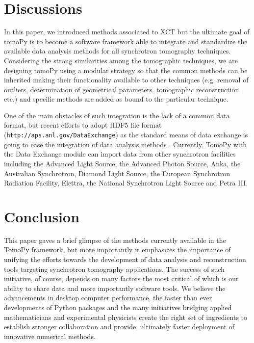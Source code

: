 \documentclass[pdf]{iucr}              %
\begin{document}


\section{Discussions}

In this paper, we introduced methods associated to XCT but the ultimate goal of tomoPy is to become a software framework able to integrate and standardize the available data analysis methods for all synchrotron tomography techniques. Considering the strong similarities among the tomographic techniques, we are designing tomoPy using a modular strategy so that the common methods can be inherited making their functionality available to other techniques (e.g. removal of outliers, determination of geometrical parameters, tomographic reconstruction, etc.) and specific methods are added as bound to the particular technique. 

One of the main obstacles of such integration is the lack of a common data format, but recent efforts to adopt HDF5 file format (\texttt{http://aps.anl.gov/DataExchange}) as the standard means of data exchange is going to ease the integration of data analysis methods \cite{Francesco2014}. Currently, TomoPy with the Data Exchange module can import data from other synchrotron facilities including the Advanced Light Source, the Advanced Photon Source, Anka, the Australian Synchrotron, Diamond Light Source, the European Synchrotron Radiation Facility, Elettra, the National Synchrotron Light Source and Petra III. 

\section{Conclusion}

This paper gaves a brief glimpse of the methods currently available in the TomoPy framework, but more importantly it emphasizes the importance of unifying the efforts towards the development of data analysis and reconstruction tools targeting synchrotron tomography applications. The success of such initiative, of course, depends on many factors the most critical of which is our ability to share data and more importantly software tools. We believe the advancements in desktop computer performance, the faster than ever developments of Python packages and the many initiatives bridging applied mathematicians and experimental physicists create the right set of ingredients to establish stronger collaboration and provide, ultimately faster deployment of innovative numerical methods.
\end{document}
